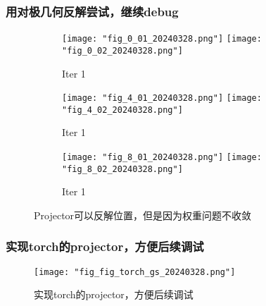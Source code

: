 \documentclass{njupre/njupre}
\begin{document}
\begin{frame}
    \frametitle{用对极几何反解尝试，继续debug}
    \begin{figure}
        \begin{subfigure}{0.8\linewidth}
            \texttt{[image: "fig\_0\_01\_20240328.png"]}
            \texttt{[image: "fig\_0\_02\_20240328.png"]}
            \caption{Iter 1}
        \end{subfigure}
        \begin{subfigure}{0.8\linewidth}
            \texttt{[image: "fig\_4\_01\_20240328.png"]}
            \texttt{[image: "fig\_4\_02\_20240328.png"]}
            \caption{Iter 1}
        \end{subfigure}
        \begin{subfigure}{0.8\linewidth}
            \texttt{[image: "fig\_8\_01\_20240328.png"]}
            \texttt{[image: "fig\_8\_02\_20240328.png"]}
            \caption{Iter 1}
        \end{subfigure}
        \caption{Projector可以反解位置，但是因为权重问题不收敛}
    \end{figure}
\end{frame}

\begin{frame}
    \frametitle{实现torch的projector，方便后续调试}
    \begin{figure}
        \texttt{[image: "fig\_fig\_torch\_gs\_20240328.png"]}
        \caption{实现torch的projector，方便后续调试}
    \end{figure}
\end{frame}
\end{document}
